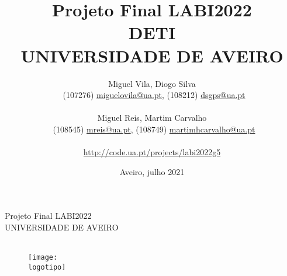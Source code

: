 \documentclass{report}
\begin{document}
\def\titulo{Projeto Final LABI2022}
\def\data{Aveiro, julho 2021}
\def\autoresa{Miguel Vila, Diogo Silva}
\def\autoresb{Miguel Reis, Martim Carvalho}
\def\autoresacontactos{(107276) \href{mailto:miguelovila@ua.pt}{miguelovila@ua.pt}, (108212) \href{mailto:dsgps@ua.pt}{dsgps@ua.pt}}
\def\autoresbcontactos{(108545) \href{mailto:mreis@ua.pt}{mreis@ua.pt}, (108749) \href{mailto:martimhcarvalho@ua.pt}{martimhcarvalho@ua.pt}}
\def\projetocodeua{\url{http://code.ua.pt/projects/labi2022g5}}
\def\departamento{DETI}
\def\empresa{UNIVERSIDADE DE AVEIRO}
\def\logotipo{ua.pdf}

\begin{titlepage}
\begin{center}
\vspace*{20mm}
{\Huge \titulo}\\ 
\vspace{10mm}
{\Large \empresa}\\
\vspace{10mm}
{\LARGE \autores}\\ 
\vspace{30mm}
\begin{figure}[h]
\center
\texttt{[image: \\logotipo]}
\end{figure}
\vspace{20mm}
\end{center}
\begin{flushright}
\end{flushright}
\end{titlepage}

\begin{titlepage}
\title{%
{\Huge\textbf{\titulo}}\\
{\Large \departamento\\ \empresa}
}
\author{
  \autoresa\\\
  \autoresacontactos\\\\
  \autoresb\\\
  \autoresbcontactos\\\\
  \projetocodeua
}
\date{\data}
\maketitle
{}
\end{titlepage}
\end{document}
